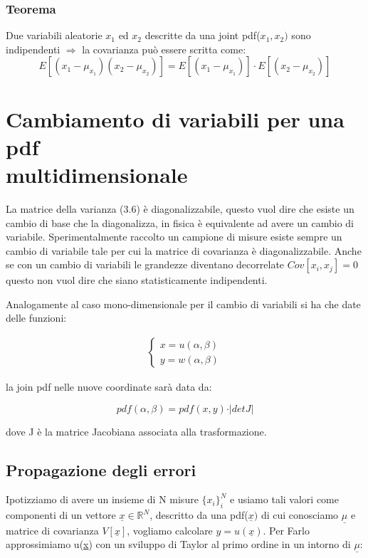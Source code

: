 \documentclass[11pt,a4paper]{book}
\begin{document}
\subsubsection{Teorema}
Due variabili aleatorie $x_1$ ed $x_2$ descritte da una joint pdf($x_1,x_2)$ sono indipendenti $\Rightarrow$ la covarianza pu\`{o} essere scritta come:
\begin{equation}
	E[(x_1-\mu_{x_1})(x_2 - \mu_{x_2})] = E[(x_1-\mu_{x_1})] \cdot E[(x_2 - \mu_{x_2})]
\end{equation}
 
\section{Cambiamento di variabili per una pdf \\ multidimensionale}

La matrice della varianza (3.6) \`{e} diagonalizzabile, questo vuol dire che esiste un cambio di base che la diagonalizza, in fisica \`{e} equivalente ad avere un cambio di variabile. Sperimentalmente raccolto un campione di misure esiste sempre un cambio di variabile tale per cui la matrice di covarianza \`{e} diagonalizzabile. Anche se con un cambio di variabili le grandezze diventano decorrelate $Cov[x_i,x_j] = 0$ questo non vuol dire che siano statisticamente indipendenti.

Analogamente al caso mono-dimensionale per il cambio di variabili si ha che date delle funzioni:

\begin{align*}
	\begin{cases}
		x = u(\alpha,\beta)\\
		y = w(\alpha, \beta)
	\end{cases}
\end{align*}

la join pdf nelle nuove coordinate sar\`{a} data da:

\begin{equation}
	pdf(\alpha, \beta) = pdf(x,y) \cdot \vert detJ\vert
\end{equation}

dove J \`{e} la matrice Jacobiana associata alla trasformazione.
\subsection{Propagazione degli errori}

Ipotizziamo di avere un insieme di N misure $\{x_i\}_i^N$ e usiamo tali valori come componenti di un vettore $\underline{x} \in \mathbb{R}^N$, descritto da una pdf($\underline{x})$ di cui conosciamo $\underline{\mu}$ e matrice di covarianza $V[\underline{x}]$, vogliamo calcolare $y = u(\underline{x})$. Per Farlo approssimiamo u(\underline{x}) con un sviluppo di Taylor al primo ordine in un intorno di $\underline{\mu}$:
\end{document}
